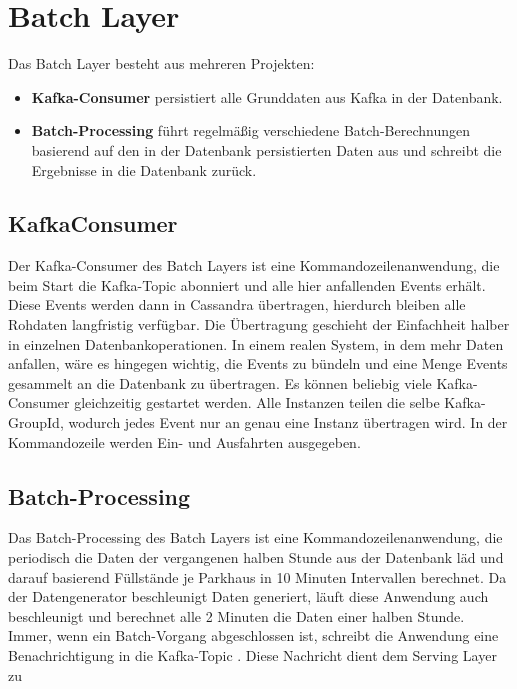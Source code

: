 \section{Batch Layer}
Das Batch Layer besteht aus mehreren Projekten:
\begin{itemize}
    \item \textbf{Kafka-Consumer} persistiert alle Grunddaten aus Kafka in der Datenbank.
    \item \textbf{Batch-Processing} führt regelmäßig verschiedene Batch-Berechnungen basierend auf den in der Datenbank persistierten Daten aus und schreibt die Ergebnisse in die Datenbank zurück. 
\end{itemize}

\subsection{KafkaConsumer}
Der Kafka-Consumer des Batch Layers ist eine Kommandozeilenanwendung, die beim Start die Kafka-Topic  abonniert und alle hier anfallenden Events erhält.
Diese Events werden dann in Cassandra übertragen, hierdurch bleiben alle Rohdaten langfristig verfügbar.
Die Übertragung geschieht der Einfachheit halber in einzelnen Datenbankoperationen.
In einem realen System, in dem mehr Daten anfallen, wäre es hingegen wichtig, die Events zu bündeln und eine Menge Events gesammelt an die Datenbank zu übertragen.
Es können beliebig viele Kafka-Consumer gleichzeitig gestartet werden.
Alle Instanzen teilen die selbe Kafka-GroupId, wodurch jedes Event nur an genau eine Instanz übertragen wird.
In der Kommandozeile werden Ein- und Ausfahrten ausgegeben.

\subsection{Batch-Processing}
Das Batch-Processing des Batch Layers ist eine Kommandozeilenanwendung, die periodisch die Daten der vergangenen halben Stunde aus der Datenbank läd und darauf basierend Füllstände je Parkhaus in 10 Minuten Intervallen berechnet.
Da der Datengenerator beschleunigt Daten generiert, läuft diese Anwendung auch beschleunigt und berechnet alle 2 Minuten die Daten einer halben Stunde.
Immer, wenn ein Batch-Vorgang abgeschlossen ist, schreibt die Anwendung eine Benachrichtigung in die Kafka-Topic .
Diese Nachricht dient dem Serving Layer zu


